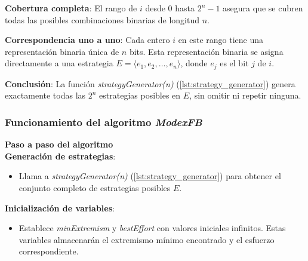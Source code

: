 \documentclass[letterpaper,10pt]{article}
\begin{document}
\textbf{Cobertura completa}: El rango de $i$ desde $0$ hasta $2^n - 1$ asegura que se cubren todas las posibles combinaciones binarias de longitud $n$.

\textbf{Correspondencia uno a uno}: Cada entero $i$ en este rango tiene una representación binaria única de $n$ bits. Esta representación binaria se asigna directamente a una estrategia $E = \langle e_1, e_2, \dots, e_n \rangle$, donde $e_j$ es el bit $j$ de $i$.

\textbf{Conclusión}: La función \textit{strategyGenerator(n)} (\ref{lst:strategy_generator}) genera exactamente todas las $2^n$ estrategias posibles en $E$, sin omitir ni repetir ninguna.

\subsubsection*{Funcionamiento del algoritmo \textit{ModexFB}}

\textbf{Paso a paso del algoritmo}
\\

\textbf{Generación de estrategias}:
\begin{itemize}
    \item Llama a \textit{strategyGenerator(n)} (\ref{lst:strategy_generator}) para obtener el conjunto completo de estrategias posibles $E$.
\end{itemize}

\textbf{Inicialización de variables}:
\begin{itemize}
    \item Establece \textit{minExtremism} y \textit{bestEffort} con valores iniciales infinitos. Estas variables almacenarán el extremismo mínimo encontrado y el esfuerzo correspondiente.
\end{itemize}
\end{document}
